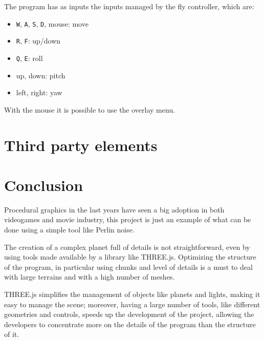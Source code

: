 \documentclass[paper=a4, fontsize=11pt]{scrartcl} %
\numberwithin{equation}{section} %
\numberwithin{figure}{section} %
\numberwithin{table}{section} %
\theoremstyle{definition}
\begin{document}
The program has as inputs the inputs managed by the fly controller, which are:

\begin{itemize}
	\item \texttt{W}, \texttt{A}, \texttt{S}, \texttt{D}, mouse: move
	\item \texttt{R}, \texttt{F}: up/down
	\item \texttt{Q}, \texttt{E}: roll
	\item up, down: pitch
	\item left, right: yaw
\end{itemize}

With the mouse it is possible to use the overlay menu.


\section{Third party elements}


\section{Conclusion}

Procedural graphics in the last years have seen a big adoption in both videogames
and movie industry, this project is just an example of what can be done using
a simple tool like Perlin noise.

The creation of a complex planet full of details is not straightforward, even
by using tools made available by a library like THREE.js. Optimizing the structure of the program, in particular using chunks and
level of details is a must to deal with large terrains and with a high number
of meshes.

THREE.js simplifies the management of objects like planets and lights, making
it easy to manage the scene; moreover, having a large number of tools, like
different geometries and controls, speeds up the development of the project,
allowing the developers to concentrate more on the details of the program
than the structure of it.


\newpage



\end{document}
